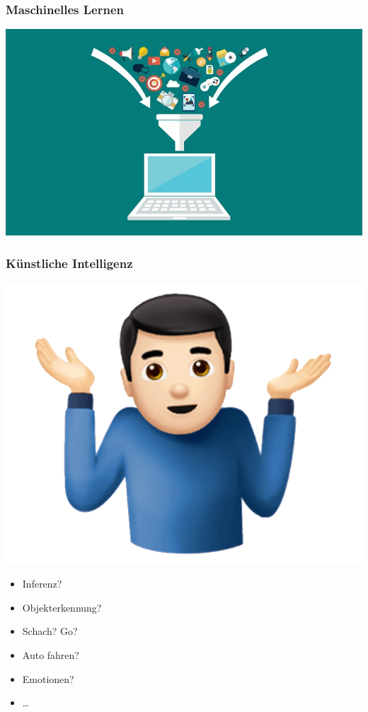 \documentclass[aspectratio=169,xcolor=dvipsnames]{beamer}
\begin{document}
\begin{frame}
\frametitle{\glqq Maschinelles Lernen\grqq}
\begin{center}
\includegraphics[height=0.7\paperheight,keepaspectratio]{images/funnel} 
\end{center}
\end{frame}

\begin{frame}
\frametitle{\glqq Künstliche Intelligenz\grqq}
\begin{minipage}{0.5\paperwidth}
\begin{center}
\includegraphics[height=0.6\paperheight,keepaspectratio]{images/man-shrug} 
\end{center}
\end{minipage}\begin{minipage}{0.3\paperwidth}
\Large
\begin{itemize}
\pause\item Inferenz?
\pause\item Objekterkennung?
\pause\item Schach? Go?
\pause\item Auto fahren?
\pause\item Emotionen?
\pause\item \dots
\end{itemize}
\end{minipage}
\end{frame}
\end{document}

